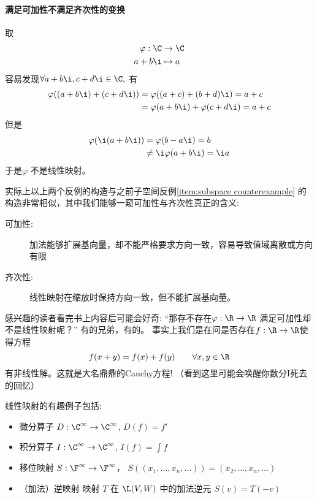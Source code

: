 \paragraph{满足可加性不满足齐次性的变换}
取
\begin{align*}
  \varphi: \C &\to \C \\
  a+b \i &\mapsto a
\end{align*}
容易发现\(\forall a+b\i,c+d\i \in \C,\) 有
\begin{align*}
  \varphi((a+b\i)+(c+d\i)) &= \varphi((a+c)+(b+d)\i) = a+c \\
  &=\varphi(a+b\i) + \varphi(c+d\i) =a+c
\end{align*}
但是
\begin{align*}
  \varphi(\i(a+b\i)) &= \varphi(b-a\i) = b \\
  &\neq \i\varphi(a+b\i) =\i a
\end{align*}
于是\(\varphi\) 不是线性映射。

实际上以上两个反例的构造与之前子空间反例\ref{item:subspace
counterexample}
的构造非常相似，其中我们能够一窥可加性与齐次性真正的含义:
\begin{description}
  \item[可加性:] 加法能够扩展基向量，却不能严格要求方向一致，容易导致值域离散或方向有限
  \item[齐次性:] 线性映射在缩放时保持方向一致，但不能扩展基向量。
\end{description}

感兴趣的读者看完书上内容后可能会好奇: ``那存不存在\(\varphi: \R \to
\R\) 满足可加性却不是线性映射呢？'' 有的兄弟，有的。
事实上我们是在问是否存在\(f:\R \to \R\)使得方程
\[
  f(x+y) = f(x) + f(y) \qquad \forall x,y \in \R
\]
有非线性解。这就是大名鼎鼎的Cauchy方程! （看到这里可能会唤醒你数分I死去的回忆）

线性映射的有趣例子包括:
\begin{itemize}
  \item 微分算子 \(D: \C^{\infty} \to
    \C^{\infty}\), \(D(f) = f'\)
  \item 积分算子 \(I: \C^{\infty} \to
    \C^{\infty}\), \(I(f) = \int f\)
  \item 移位映射 \(S: \F^{\infty} \to \F^{\infty}\)，
    \(S((x_{1},\dots, x_{n}, \dots)) = (x_{2},\dots,
    x_{n}, \dots)\)
  \item （加法）逆映射 映射 \(T\) 在 \(\L(V,W)\) 中的加法逆元
    \(S(v)=T(-v)\)
\end{itemize}
